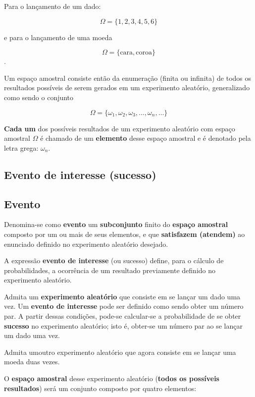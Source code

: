 \documentclass[
]{book}
\begin{document}
Para o lançamento de um dado:

\[
\Omega = \{ 1,2,3,4,5,6\}
\]

e para o lançamento de uma moeda

\[\Omega=\{\text{cara}, \text{coroa}\}
\].

Um espaço amostral consiste então da enumeração (finita ou infinita) de todos os resultados possíveis de serem gerados em um experimento aleatório, generalizado como sendo o conjunto

\[
\Omega = \{\omega_{1}, \omega_{2}, \omega_{3}, ..., \omega_{n}, \dots \}
\]

\textbf{Cada um} dos possíveis resultados de um experimento aleatório com espaço amostral \(\Omega\) é chamado de um \textbf{elemento} desse espaço amostral e é denotado pela letra grega: \(\omega_{n}\).

\hypertarget{evento-de-interesse-sucesso}{%
\subsection{Evento de interesse (sucesso)}\label{evento-de-interesse-sucesso}}

\hfill\break

\hypertarget{evento}{%
\subsection{Evento}\label{evento}}

\hfill\break

Denomina-se como \textbf{evento} um \textbf{subconjunto} finito do \textbf{espaço amostral} composto por um ou mais de seus elementos, e que \textbf{satisfazem (atendem)} ao enunciado definido no experimento aleatório desejado.

A expressão \textbf{evento de interesse} (ou sucesso) define, para o cálculo de probabilidades, a ocorrência de um resultado previamente definido no experimento aleatório.

Admita um \textbf{experimento aleatório} que consiste em se lançar um dado uma vez. Um \textbf{evento de interesse} pode ser definido como sendo obter um número par. A partir dessas condições, pode-se calcular-se a probabilidade de se obter \textbf{sucesso} no experimento aleatório; isto é, obter-se um número par ao se lançar um dado uma vez.

Admita umoutro experimento aleatório que agora consiste em se lançar uma moeda duas vezes.

O \textbf{espaço amostral} desse experimento aleatório (\textbf{todos os possíveis resultados}) será um conjunto composto por quatro elementos:
\end{document}
